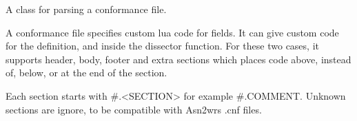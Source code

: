 \documentclass[A4paper,10pt,english]{sphinxmanual}
\begin{document}

\begin{fulllineitems}
\label{devel/code:config.ConformanceFile}
A class for parsing a conformance file.

A conformance file specifies custom lua code for fields.
It can give custom code for the definition, and inside the dissector
function. For these two cases, it supports header, body, footer and
extra sections which places code above, instead of, below, or at the
end of the section.

Each section starts with \#.\textless{}SECTION\textgreater{} for example \#.COMMENT.
Unknown sections are ignore, to be compatible with Asn2wrs .cnf files.

\begin{fulllineitems}
\label{devel/code:config.ConformanceFile.t_def_hdr}
\end{fulllineitems}


\begin{fulllineitems}
\label{devel/code:config.ConformanceFile.t_def_body}
\end{fulllineitems}


\begin{fulllineitems}
\label{devel/code:config.ConformanceFile.t_def_ftr}
\end{fulllineitems}


\begin{fulllineitems}
\label{devel/code:config.ConformanceFile.t_def_extra}
\end{fulllineitems}


\begin{fulllineitems}
\label{devel/code:config.ConformanceFile.t_func_hdr}
\end{fulllineitems}


\end{fulllineitems}
\end{document}
